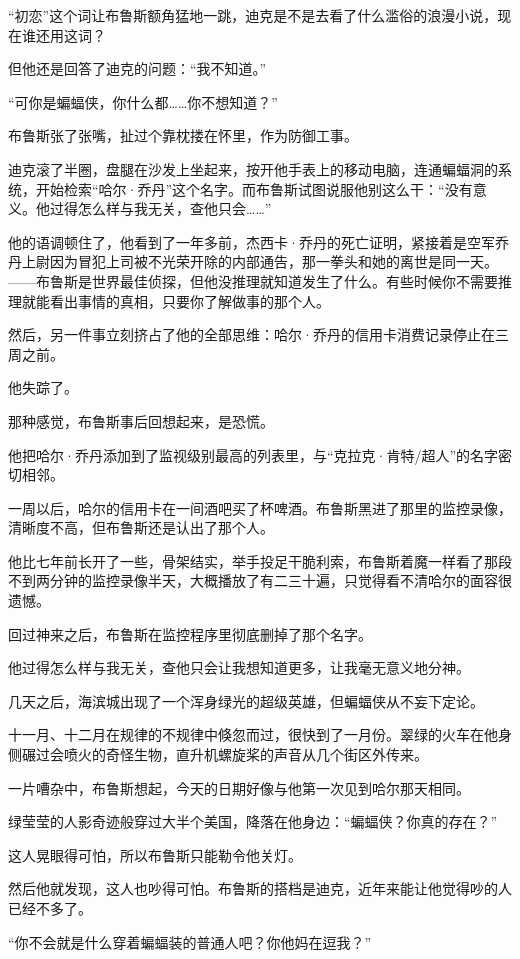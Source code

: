 \documentclass[../main]{subfiles}
\begin{document}
“初恋”这个词让布鲁斯额角猛地一跳，迪克是不是去看了什么滥俗的浪漫小说，现在谁还用这词？

但他还是回答了迪克的问题：“我不知道。”

“可你是蝙蝠侠，你什么都……你不想知道？”

布鲁斯张了张嘴，扯过个靠枕搂在怀里，作为防御工事。

迪克滚了半圈，盘腿在沙发上坐起来，按开他手表上的移动电脑，连通蝙蝠洞的系统，开始检索“哈尔·乔丹”这个名字。而布鲁斯试图说服他别这么干：“没有意义。他过得怎么样与我无关，查他只会\ldots\ldots”

他的语调顿住了，他看到了一年多前，杰西卡·乔丹的死亡证明，紧接着是空军乔丹上尉因为冒犯上司被不光荣开除的内部通告，那一拳头和她的离世是同一天。——布鲁斯是世界最佳侦探，但他没推理就知道发生了什么。有些时候你不需要推理就能看出事情的真相，只要你了解做事的那个人。

然后，另一件事立刻挤占了他的全部思维：哈尔·乔丹的信用卡消费记录停止在三周之前。

他失踪了。

那种感觉，布鲁斯事后回想起来，是恐慌。

他把哈尔·乔丹添加到了监视级别最高的列表里，与“克拉克·肯特/超人”的名字密切相邻。

一周以后，哈尔的信用卡在一间酒吧买了杯啤酒。布鲁斯黑进了那里的监控录像，清晰度不高，但布鲁斯还是认出了那个人。

他比七年前长开了一些，骨架结实，举手投足干脆利索，布鲁斯着魔一样看了那段不到两分钟的监控录像半天，大概播放了有二三十遍，只觉得看不清哈尔的面容很遗憾。

回过神来之后，布鲁斯在监控程序里彻底删掉了那个名字。

他过得怎么样与我无关，查他只会让我想知道更多，让我毫无意义地分神。

几天之后，海滨城出现了一个浑身绿光的超级英雄，但蝙蝠侠从不妄下定论。

十一月、十二月在规律的不规律中倏忽而过，很快到了一月份。翠绿的火车在他身侧碾过会喷火的奇怪生物，直升机螺旋桨的声音从几个街区外传来。

一片嘈杂中，布鲁斯想起，今天的日期好像与他第一次见到哈尔那天相同。

绿莹莹的人影奇迹般穿过大半个美国，降落在他身边：“蝙蝠侠？你真的存在？”

这人晃眼得可怕，所以布鲁斯只能勒令他关灯。

然后他就发现，这人也吵得可怕。布鲁斯的搭档是迪克，近年来能让他觉得吵的人已经不多了。

“你不会就是什么穿着蝙蝠装的普通人吧？你他妈在逗我？”
\end{document}
